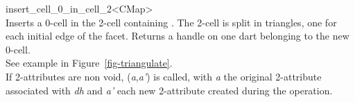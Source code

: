 \begin{ccRefFunction}{insert_cell_0_in_cell_2<CMap>}
\\

{Inserts a 0-cell in the 2-cell containing .
  The 2-cell is split in triangles, one for each initial edge of the facet.
  Returns a handle on one dart belonging to the new 0-cell.
 \\
  See example in Figure~\ref{fig-triangulate}.\\
    If 2-attributes are non void, 
    (\emph{a},\emph{a'}) is called, with \emph{a} the original 2-attribute associated
    with \emph{dh} and \emph{a'} each new 2-attribute created during the operation.
}

\ccSeeAlso
{}\\
\\
\\
\\
\\
\end{ccRefFunction}
